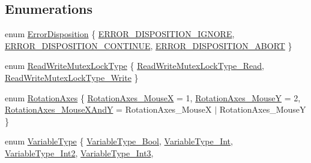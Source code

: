 \subsection*{Enumerations}
\begin{DoxyCompactItemize}
\item 
enum \hyperlink{namespacemage_a7146b3c3db53179eeb32bf4d51934715}{Error\+Disposition} \{ \hyperlink{namespacemage_a7146b3c3db53179eeb32bf4d51934715a4e2fb15c20db8e908d57e1aca6f4c04b}{E\+R\+R\+O\+R\+\_\+\+D\+I\+S\+P\+O\+S\+I\+T\+I\+O\+N\+\_\+\+I\+G\+N\+O\+RE}, 
\hyperlink{namespacemage_a7146b3c3db53179eeb32bf4d51934715aed8dd8c3d30ca6bdddb75fb2e52560b6}{E\+R\+R\+O\+R\+\_\+\+D\+I\+S\+P\+O\+S\+I\+T\+I\+O\+N\+\_\+\+C\+O\+N\+T\+I\+N\+UE}, 
\hyperlink{namespacemage_a7146b3c3db53179eeb32bf4d51934715a9b39ef50a35cd069416b347c28825cef}{E\+R\+R\+O\+R\+\_\+\+D\+I\+S\+P\+O\+S\+I\+T\+I\+O\+N\+\_\+\+A\+B\+O\+RT}
 \}
\item 
enum \hyperlink{namespacemage_afd76fcca37ce5c5b2227671290973c74}{Read\+Write\+Mutex\+Lock\+Type} \{ \hyperlink{namespacemage_afd76fcca37ce5c5b2227671290973c74a900403891acbbc9919f9fcec04858549}{Read\+Write\+Mutex\+Lock\+Type\+\_\+\+Read}, 
\hyperlink{namespacemage_afd76fcca37ce5c5b2227671290973c74ae31c6ff6e73cbaa720f5359edee0da04}{Read\+Write\+Mutex\+Lock\+Type\+\_\+\+Write}
 \}
\item 
enum \hyperlink{namespacemage_a548e5c31b08a1078841ed21948f5bf4c}{Rotation\+Axes} \{ \hyperlink{namespacemage_a548e5c31b08a1078841ed21948f5bf4ca4b43faee47620c82f4223a55d7de4ddb}{Rotation\+Axes\+\_\+\+MouseX} = 1, 
\hyperlink{namespacemage_a548e5c31b08a1078841ed21948f5bf4ca0c20aa8d3a6ad2edf788cfb45cc950e1}{Rotation\+Axes\+\_\+\+MouseY} = 2, 
\hyperlink{namespacemage_a548e5c31b08a1078841ed21948f5bf4ca6b0dd5cb81f83efb4c2b36456d84750d}{Rotation\+Axes\+\_\+\+Mouse\+X\+AndY} = Rotation\+Axes\+\_\+\+MouseX $\vert$ Rotation\+Axes\+\_\+\+MouseY
 \}
\item 
enum \hyperlink{namespacemage_a530428e73bac0ba7fe84b29086a9e33a}{Variable\+Type} \{ \newline
\hyperlink{namespacemage_a530428e73bac0ba7fe84b29086a9e33aa3e931f5acb84d36faafd4e2a9a927413}{Variable\+Type\+\_\+\+Bool}, 
\hyperlink{namespacemage_a530428e73bac0ba7fe84b29086a9e33aae0b6cd2e0baf9fe25bdad167df6839fe}{Variable\+Type\+\_\+\+Int}, 
\hyperlink{namespacemage_a530428e73bac0ba7fe84b29086a9e33aacc3025667a8103a37ec86e3d953f27e9}{Variable\+Type\+\_\+\+Int2}, 
\hyperlink{namespacemage_a530428e73bac0ba7fe84b29086a9e33aaf09835cc5d74cc33e0949bee9899ba3e}{Variable\+Type\+\_\+\+Int3}, 
\newline

\end{DoxyCompactItemize}
